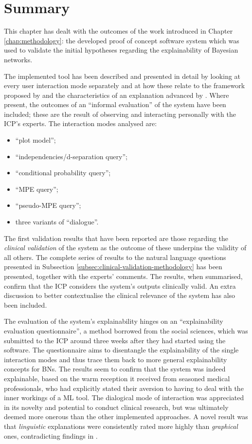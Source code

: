 \section{Summary}
This chapter has dealt with the outcomes of the work introduced in Chapter \ref{chap:methodology}: the developed proof of concept software system which was used to validate the initial hypotheses regarding the explainability of Bayesian networks.

The implemented tool has been described and presented in detail by looking at every user interaction mode separately and at how these relate to the framework proposed by \citet{lacave2002review} and the characteristics of an explanation advanced by \citet{miller2018explanation}.
Where present, the outcomes of an \enquote{informal evaluation} of the system have been included; these are the result of observing and interacting personally with the ICP's experts.
The interaction modes analysed are:
\begin{itemize}
  \item \enquote{plot model};
  \item \enquote{independencies/d-separation query};
  \item \enquote{conditional probability query};
  \item \enquote{MPE query};
  \item \enquote{pseudo-MPE query};
  \item three variants of \enquote{dialogue}.
\end{itemize}

The first validation results that have been reported are those regarding the \textit{clinical validation} of the system as the outcome of these underpins the validity of all others.
The complete series of results to the natural language questions presented in Subsection \ref{subsec:clinical-validation-methodology} has been presented, together with the experts' comments.
The results, when summarised, confirm that the ICP considers the system's outputs clinically valid.
An extra discussion to better contextualise the clinical relevance of the system has also been included.

The evaluation of the system's explainability hinges on an \enquote{explainability evaluation questionnaire}, a method borrowed from the social sciences, which was submitted to the ICP around three weeks after they had started using the software.
The questionnaire aims to disentangle the explainability of the single interaction modes and thus trace them back to more general explainability concepts for BNs.
The results seem to confirm that the system was indeed explainable, based on the warm reception it received from seasoned medical professionals, who had explicitly stated their aversion to having to deal with the inner workings of a ML tool.
The dialogical mode of interaction was appreciated in its novelty and potential to conduct clinical research, but was ultimately deemed more onerous than the other implemented approaches.
A novel result was that \textit{linguistic} explanations were consistently rated more highly than \textit{graphical} ones, contradicting findings in \citep{lacave2002review}.

